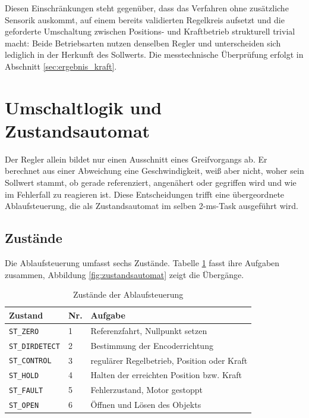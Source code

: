 Diesen Einschränkungen steht gegenüber, dass das Verfahren ohne zusätzliche Sensorik
auskommt, auf einem bereits validierten Regelkreis aufsetzt und die geforderte
Umschaltung zwischen Positions- und Kraftbetrieb strukturell trivial macht: Beide
Betriebsarten nutzen denselben Regler und unterscheiden sich lediglich in der Herkunft
des Sollwerts. Die messtechnische Überprüfung erfolgt in Abschnitt
\ref{sec:ergebnis_kraft}.

\section{Umschaltlogik und Zustandsautomat}
\label{sec:zustandsautomat}

Der Regler allein bildet nur einen Ausschnitt eines Greifvorgangs ab. Er berechnet aus
einer Abweichung eine Geschwindigkeit, weiß aber nicht, woher sein Sollwert stammt, ob
gerade referenziert, angenähert oder gegriffen wird und wie im Fehlerfall zu reagieren
ist. Diese Entscheidungen trifft eine übergeordnete Ablaufsteuerung, die als
Zustandsautomat im selben 2-ms-Task ausgeführt wird.

\subsection*{Zustände}

Die Ablaufsteuerung umfasst sechs Zustände. Tabelle \ref{tab:zustaende} fasst ihre
Aufgaben zusammen, Abbildung \ref{fig:zustandsautomat} zeigt die Übergänge.

\begin{table}[htbp]
    \centering
    \caption{Zustände der Ablaufsteuerung}
    \label{tab:zustaende}
    \begin{tabular}{llp{7.5cm}}
        \hline
        Zustand & Nr. & Aufgabe \\
        \hline
        \texttt{ST\_ZERO}      & 1 & Referenzfahrt, Nullpunkt setzen \\
        \texttt{ST\_DIRDETECT} & 2 & Bestimmung der Encoderrichtung \\
        \texttt{ST\_CONTROL}   & 3 & regulärer Regelbetrieb, Position oder Kraft \\
        \texttt{ST\_HOLD}      & 4 & Halten der erreichten Position bzw. Kraft \\
        \texttt{ST\_FAULT}     & 5 & Fehlerzustand, Motor gestoppt \\
        \texttt{ST\_OPEN}      & 6 & Öffnen und Lösen des Objekts \\
        \hline
    \end{tabular}
\end{table}

